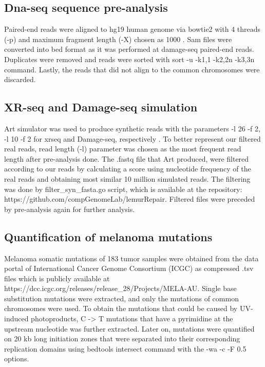 \subsection{Dna-seq sequence pre-analysis}
Paired-end reads were aligned to hg19 human genome via bowtie2 with 4 threads (-p) and maximum fragment length (-X) chosen as 1000 \citep{langmead2012fast}. Sam files were converted into bed format as it was performed at damage-seq paired-end reads. Duplicates were removed and reads were sorted with sort -u -k1,1 -k2,2n -k3,3n command. Lastly, the reads that did not align to the common chromosomes were discarded.

\subsection{XR-seq and Damage-seq simulation}
Art simulator was used to produce synthetic reads with the parameters
-l 26 -f 2, -l 10 -f 2 for \gls{xrseq} and Damage-seq, respectively \citep{huang2012art}. To better represent our filtered real reads, read length (-l) parameter was chosen as the most frequent read length after pre-analysis done. The .fastq file that Art produced, were filtered according to our reads by calculating a score using nucleotide frequency of the real reads and obtaining most similar 10 million simulated reads. 
The filtering was done by filter\_syn\_fasta.go script, which is available at the repository: https://github.com/compGenomeLab/lemurRepair. 
Filtered files were preceded by pre-analysis again for further analysis.

\subsection{Quantification of melanoma mutations}
Melanoma somatic mutations of 183 tumor samples were obtained from the data portal of International Cancer Genome Consortium (ICGC) as compressed .tsv files which is publicly available at https://dcc.icgc.org/releases/release\_28/Projects/MELA-AU. Single base substitution mutations were extracted, and only the mutations of common chromosomes were used. To obtain the mutations that could be caused by UV-induced photoproducts, C -> T mutations that have a pyrimidine at the upstream nucleotide was further extracted. Later on, mutations were quantified on 20 kb long initiation zones that were separated into their corresponding replication domains using bedtools intersect command with the -wa -c -F 0.5 options.

